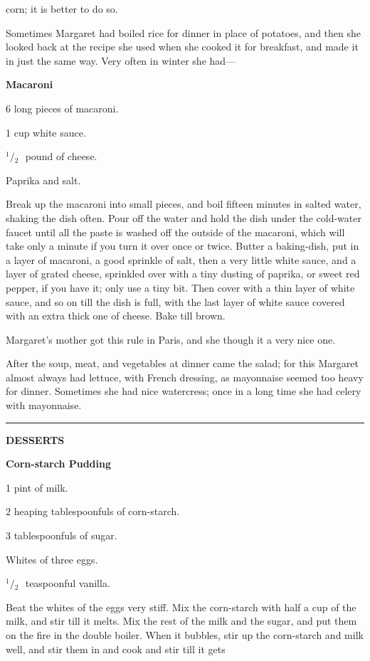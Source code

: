 \documentclass[11pt]{book}
\newcommand{\hstroke}{\rule[0.5ex]{5.0em}{0.2ex}}
\newcommand{\indpar}{\par\noindent\hspace*{\parindent}}
\newcommand{\ingredient}{\indpar}
\newcommand{\instruction}{\indpar}
\newcommand{\OneHalf}{\ensuremath{{}^1\!\!/\!{}_2\mbox{\ }}}
\newenvironment{RecipeTitle}{\medskip\begin{center}\large\bf }{\end{center}\smallskip}
\newenvironment{FoodTypeTitle}{\begin{center}\large\bf }{\end{center}}
\begin{document}
corn; it is better to do so.
\medskip
\indpar
  Sometimes Margaret had boiled rice for dinner in place of
potatoes, and then she looked back at the recipe she used when
she cooked it for breakfast, and made it in just the same way.
Very often in winter she had---
\begin{RecipeTitle}
                      Macaroni\label{macaroni}
\end{RecipeTitle}
\ingredient  6 long pieces of macaroni.
\ingredient  1 cup white sauce.
\ingredient  \OneHalf pound of cheese.
\ingredient  Paprika and salt.
\instruction  Break up the macaroni into small pieces, and boil fifteen
minutes in salted water, shaking the dish often.  Pour off the
water and hold the dish under the cold-water faucet until all
the paste is washed off the outside of the macaroni, which
will take only a minute if you turn it over once or twice.
Butter a baking-dish, put in a layer of macaroni, a good
sprinkle of salt, then a very little white sauce, and a layer
of grated cheese, sprinkled over with a tiny dusting of
paprika, or sweet red pepper, if you have it; only use a tiny
bit.  Then cover with a thin layer of white sauce, and so on
till the dish is full, with the last layer of white sauce
covered with an extra thick one of cheese.  Bake till brown.
\instruction  Margaret's mother got this rule in Paris, and she though it
a very nice one.
\smallskip
\indpar
  After the soup, meat, and vegetables at dinner came the
salad; for this Margaret almost always had lettuce, with
French dressing, as mayonnaise seemed too heavy for dinner.
Sometimes she had nice watercress; once in a long time she had
celery with mayonnaise.
\bigskip
\begin{center}
\hstroke
\end{center}\pagebreak[4]
\begin{FoodTypeTitle}
DESSERTS\label{DESSERTS}
\end{FoodTypeTitle}
\begin{RecipeTitle}
Corn-starch Pudding\label{plain_cornstarch_pudding}
\end{RecipeTitle}
\ingredient  1 pint of milk.
\ingredient  2 heaping tablespoonfuls of corn-starch.
\ingredient  3 tablespoonfuls of sugar.
\ingredient  Whites of three eggs.
\ingredient  \OneHalf teaspoonful vanilla.
\instruction  Beat the whites of the eggs very stiff.
Mix the corn-starch
with half a cup of the milk, and stir till it melts.  Mix the
rest of the milk and the sugar, and put them on the fire in
the double boiler.  When it bubbles, stir up the corn-starch
and milk well, and stir them in and cook and stir till it gets
\end{document}
